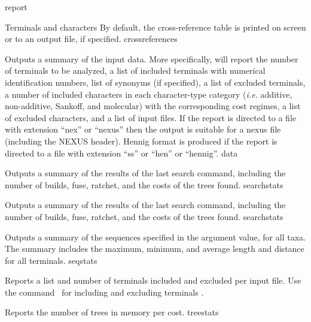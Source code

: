\begin{command}{report}{}
\begin{arguments}
\begin{argumentgroup}{Terminals and characters}
{                By default, the cross-reference table is printed on screen or to an
                output file, if specified.}
                {crossreferences}

                {Outputs a summary of the input data.
                More specifically, \poy will report the number of
                terminals to be analyzed, a list of included terminals with
                numerical identification numbers, list
                of synonyms (if specified), a list of excluded terminals, a
                number of included characters in each character-type category
                (\emph{i.e.} additive, non-additive, Sankoff, and molecular) with the corresponding
                cost regimes, a list of excluded
                characters, and a list of input files. If the report is directed
                to a file with extension ``nex'' or ``nexus'' then
                the output is suitable for a nexus file (including the NEXUS
                header). Hennig format is produced if the report is directed
                to a file with extension ``ss'' or ``hen'' or ``hennig''.}
                {data}

                {Outputs a summary of the results of the last search command,
                including the number of builds, fuse, ratchet, and the costs of
                the trees found.}
                {searchstats}

                {Outputs a summary of the results of the last search command,
                including the number of builds, fuse, ratchet, and the costs of
                the trees found.}
                {searchstats}

                {Outputs a summary of the sequences specified in the argument
                value, for all taxa. The summary includes the maximum, minimum,
                and average length and distance for all terminals.}
                {seqstats}

                {Reports a list and number of terminals included and excluded
                per input file. Use the command~ for including and excluding
                terminals .}
                {}

                {Reports the number of trees in memory per cost.}
                {treestats}


\end{argumentgroup}
\end{arguments}
\end{command}
